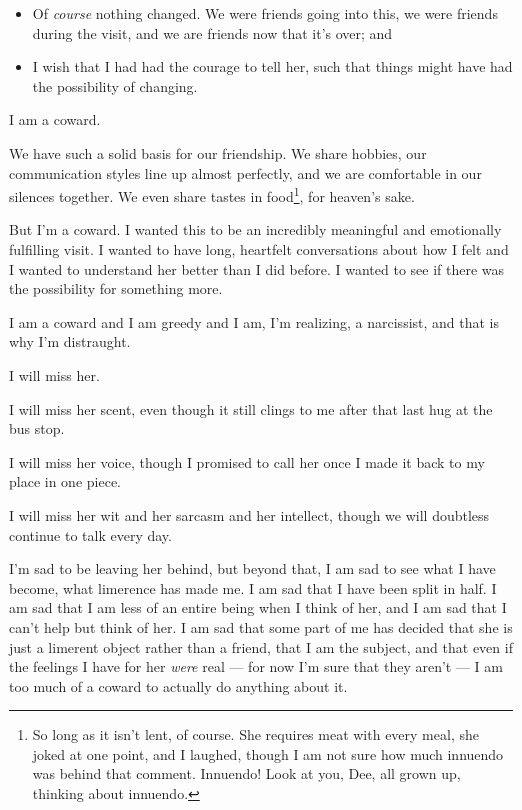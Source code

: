 \begin{itemize}
\tightlist
\item
  Of \emph{course} nothing changed. We were friends going into this, we were friends during the visit, and we are friends now that it's over; and
\item
  I wish that I had had the courage to tell her, such that things might have had the possibility of changing.
\end{itemize}

I am a coward.

We have such a solid basis for our friendship. We share hobbies, our communication styles line up almost perfectly, and we are comfortable in our silences together. We even share tastes in food\footnote{So long as it isn't lent, of course. She requires meat with every meal, she joked at one point, and I laughed, though I am not sure how much innuendo was behind that comment. Innuendo! Look at you, Dee, all grown up, thinking about innuendo.}, for heaven's sake.

But I'm a coward. I wanted this to be an incredibly meaningful and emotionally fulfilling visit. I wanted to have long, heartfelt conversations about how I felt and I wanted to understand her better than I did before. I wanted to see if there was the possibility for something more.

I am a coward and I am greedy and I am, I'm realizing, a narcissist, and that is why I'm distraught.

I will miss her.

I will miss her scent, even though it still clings to me after that last hug at the bus stop.

I will miss her voice, though I promised to call her once I made it back to my place in one piece.

I will miss her wit and her sarcasm and her intellect, though we will doubtless continue to talk every day.

I'm sad to be leaving her behind, but beyond that, I am sad to see what I have become, what limerence has made me. I am sad that I have been split in half. I am sad that I am less of an entire being when I think of her, and I am sad that I can't help but think of her. I am sad that some part of me has decided that she is just a limerent object rather than a friend, that I am the subject, and that even if the feelings I have for her \emph{were} real --- for now I'm sure that they aren't --- I am too much of a coward to actually do anything about it.

